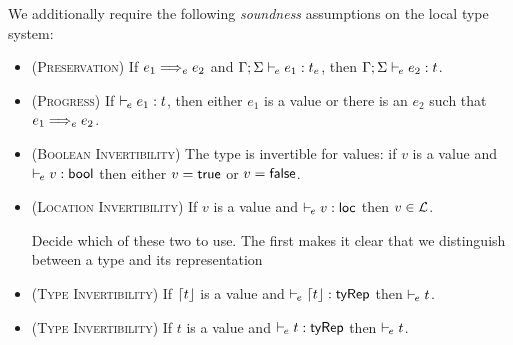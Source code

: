 \label{sec:sound-type-systems}
We additionally require the following \emph{soundness} assumptions on the local type system:
\begin{itemize}
	\item (\textsc{Preservation}) If $e_1 \localstep e_2$ and $\Gamma;\Sigma \vdash_{\mkern-2mu e} e_1 : t_e$, then $\Gamma;\Sigma \vdash_{\mkern-2mu e} e_2 : t$.

	\item (\textsc{Progress}) If $\vdash_{\mkern-2mu e} e_1 : t$, then either $e_1$ is a value or there is an $e_2$ such that $e_1 \localstep e_2$.
  
	\item (\textsc{Boolean Invertibility}) The type \Bool is invertible for values: if $v$ is a value and $\vdash_{\mkern-2mu e} v : \mathsf{bool}$ then either $v = \mathsf{true}$ or $v = \mathsf{false}$.

	\item (\textsc{Location Invertibility}) If $v$ is a value and $\vdash_{\mkern-2mu e} v : \mathsf{loc}$ then $v \in \mathcal{L}$.

  \todo Decide which of these two to use. The first makes it clear that we distinguish between a type and its representation
  
	\item (\textsc{Type Invertibility}) If $\lceil t\rfloor$ is a value and $\vdash_{\mkern-2mu e} \lceil t\rfloor : \mathsf{tyRep}$ then $\vdash_{\mkern-2mu e} t$.

 	\item (\textsc{Type Invertibility}) If $t$ is a value and $\vdash_{\mkern-2mu e} t : \mathsf{tyRep}$ then $\vdash_{\mkern-2mu e} t$.
\end{itemize}

